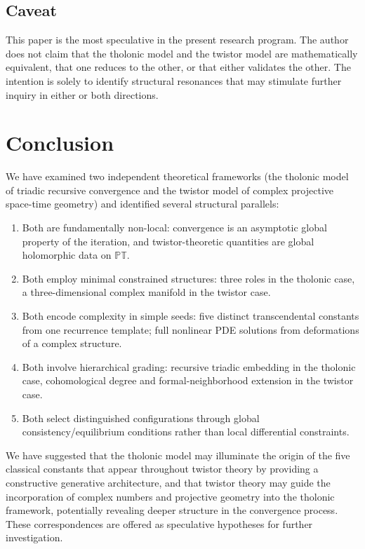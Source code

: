 \documentclass[12pt]{article}
\begin{document}
\subsection{Caveat}\label{sec:caveat}

This paper is the most speculative in the present research program.  The author does
not claim that the tholonic model and the twistor model are mathematically equivalent,
that one reduces to the other, or that either validates the other.  The intention is
solely to identify structural resonances that may stimulate further inquiry in either or
both directions.

\section{Conclusion}\label{sec:conclusion}

We have examined two independent theoretical frameworks (the tholonic model of triadic
recursive convergence and the twistor model of complex projective space-time geometry)
and identified several structural parallels:
\begin{enumerate}
  \item Both are fundamentally non-local: convergence is an asymptotic global property
        of the iteration, and twistor-theoretic quantities are global holomorphic data
        on $\mathbb{PT}$.
  \item Both employ minimal constrained structures: three roles in the tholonic case, a
        three-dimensional complex manifold in the twistor case.
  \item Both encode complexity in simple seeds: five distinct transcendental constants
        from one recurrence template; full nonlinear PDE solutions from deformations of
        a complex structure.
  \item Both involve hierarchical grading: recursive triadic embedding in the tholonic
        case, cohomological degree and formal-neighborhood extension in the twistor case.
  \item Both select distinguished configurations through global consistency/equilibrium
        conditions rather than local differential constraints.
\end{enumerate}

We have suggested that the tholonic model may illuminate the origin of the five classical
constants that appear throughout twistor theory by providing a constructive generative
architecture, and that twistor theory may guide the incorporation of complex numbers and
projective geometry into the tholonic framework, potentially revealing deeper structure
in the convergence process.  These correspondences are offered as speculative hypotheses
for further investigation.
\end{document}
